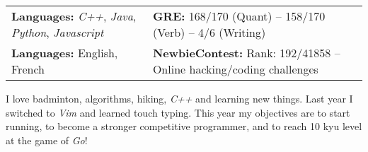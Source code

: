 \documentclass[a4paper, 12pt]{article}
\newcommand{\marginmisc}{0.3cm}
\begin{document}
\begin{footnotesize}
\noindent\begin{tabular}{@{}p{7cm}p{12cm}}
  \textbf{Languages:} \textit{C++}, \textit{Java}, \textit{Python}, \textit{Javascript} & \textbf{GRE:} 168/170 (Quant) -- 158/170 (Verb) -- 4/6 (Writing)\\
  \textbf{Languages:} English, French & \textbf{NewbieContest:} Rank: 192/41858 -- Online hacking/coding challenges\\
\end{tabular}

\vspace{\marginmisc}

\renewcommand{\baselinestretch}{0.8}
I love badminton, algorithms, hiking, \textit{C++} and learning new things. Last year I switched to \textit{Vim} and learned touch typing. This year my objectives are to start running, to become a stronger competitive programmer, and to reach 10 kyu level at the game of \textit{Go}!

\end{footnotesize}
\end{document}
